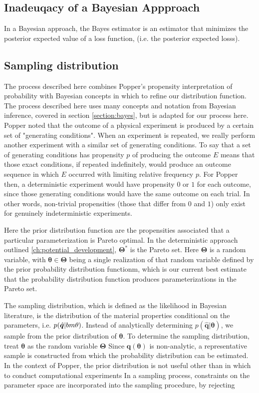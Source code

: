 \subsection{Inadeuqacy of a Bayesian Appproach}
In a Bayesian approach, the Bayes estimator is an estimator that minimizes the posterior expected value of a loss function, (i.e. the posterior expected losss).

\subsection{Sampling distribution}
The process described here combines Popper's propensity interpretation of probability with Bayesian concepts in which to refine our distribution function.  The process described here uses many concepts and notation from Bayesian inference, covered in section \ref{section:bayes}, but is adapted for our process here.  Popper noted that the outcome of a physical experiment is produced by a certain set of "generating conditions". When an experiment is repeated, we really perform another experiment with a similar set of generating conditions. To say that a set of generating conditions has propensity $p$ of producing the outcome $E$ means that those exact conditions, if repeated indefinitely, would produce an outcome sequence in which $E$ occurred with limiting relative frequency $p$. For Popper then, a deterministic experiment would have propensity $0$ or $1$ for each outcome, since those generating conditions would have the same outcome on each trial. In other words, non-trivial propensities (those that differ from $0$ and $1$) only exist for genuinely indeterministic experiments.

Here the prior distribution function are the propensities associated that a particular parameterization is Pareto optimal.  In the deterministic approach outlined \ref{ch:potential_development}, $\bm{\Theta}^*$ is the Pareto set.  Here $\bm{\Theta}$ is a random variable, with $\bm{\theta} \in \bm{\Theta}$ being a single realization of that random variable defined by the prior probability distribution functionm, which is our current best estimate that the probability distribution function produces parameterizations in the Pareto set.

The sampling distribution, which is defined as the likelihood in Bayesian literature, is the distribution of the material properties conditional on the parameters, i.e. $p(\hat{\bm{q}}|\\bm{\theta})$.  Instead of analytically determining $p(\bm{\hat{q}}|\bm{\theta})$, we sample from the prior distribution of $\bm{\theta}$.  To determine the sampling distribution, treat $\bm{\theta}$ as the random variable $\bm{\Theta}$   Since $\bm{q}(\bm{\theta})$ is non-analytic, a representative sample is constructed from which the probability distribution can be estimated.  In the context of Popper, the prior distribution is not useful other than in which to conduct computational experiments
In a sampling process, constraints on the parameter space are incorporated into the sampling procedure, by rejecting

